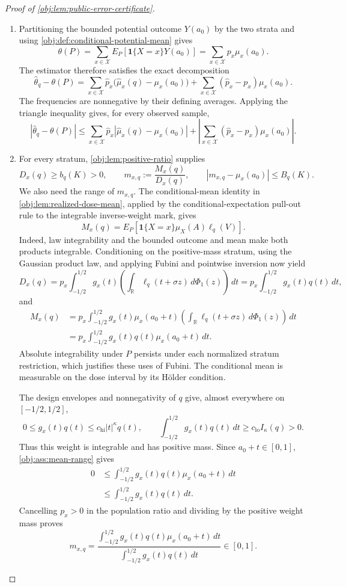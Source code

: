 \documentclass[11pt]{article}
\begin{document}
\begin{proof}[Proof of \cref{obj:lem:public-error-certificate}]
\begin{enumerate}
\item
Partitioning the bounded potential outcome \(Y(a_0)\) by the two strata
and using \cref{obj:def:conditional-potential-mean} gives
\[
\theta(P)
=\sum_{x\in\mathcal X}E_P[\mathbf1\{X=x\}Y(a_0)]
=\sum_{x\in\mathcal X}p_x\mu_x(a_0).
\]
The estimator therefore satisfies the exact decomposition
\[
\widehat\theta_q-\theta(P)
=\sum_{x\in\mathcal X}\widehat p_x
       \bigl(\widehat\mu_x(q)-\mu_x(a_0)\bigr)
 +\sum_{x\in\mathcal X}(\widehat p_x-p_x)\mu_x(a_0).
\]
The frequencies are nonnegative by their defining averages. Applying the
triangle inequality gives, for every observed sample,
\[
|\widehat\theta_q-\theta(P)|
\le
\sum_{x\in\mathcal X}\widehat p_x
       |\widehat\mu_x(q)-\mu_x(a_0)|
+\left|\sum_{x\in\mathcal X}(\widehat p_x-p_x)\mu_x(a_0)\right|.
\]

\item
For every stratum, \cref{obj:lem:positive-ratio} supplies
\[
D_x(q)\ge b_q(K)>0,\qquad
m_{x,q}:=\frac{M_x(q)}{D_x(q)},\qquad
|m_{x,q}-\mu_x(a_0)|\le B_q(K).
\]
We also need the range of \(m_{x,q}\). The conditional-mean identity in
\cref{obj:lem:realized-dose-mean}, applied by the conditional-expectation
pull-out rule to the integrable inverse-weight mark, gives
\[
M_x(q)
=E_P[\mathbf1\{X=x\}\mu_X(A)\ell_q(V)].
\]
Indeed, law integrability and the bounded outcome and mean make both
products integrable. Conditioning on the positive-mass stratum, using
the Gaussian product law, and applying Fubini and pointwise inversion
now yield
\[
D_x(q)
=p_x\int_{-1/2}^{1/2}g_x(t)
       \left(\int_{\mathbb R}\ell_q(t+\sigma z)\,d\Phi_1(z)\right)\,dt
=p_x\int_{-1/2}^{1/2}g_x(t)q(t)\,dt,
\]
and
\[
\begin{aligned}
M_x(q)
&=p_x\int_{-1/2}^{1/2}g_x(t)\mu_x(a_0+t)
       \left(\int_{\mathbb R}\ell_q(t+\sigma z)\,d\Phi_1(z)\right)\,dt\\
&=p_x\int_{-1/2}^{1/2}g_x(t)q(t)\mu_x(a_0+t)\,dt.
\end{aligned}
\]
Absolute integrability under \(P\) persists under each normalized
stratum restriction, which justifies these uses of Fubini. The
conditional mean is measurable on the dose interval by its Hölder
condition.

The design envelopes and nonnegativity of \(q\) give, almost everywhere
on \([-1/2,1/2]\),
\[
0\le g_x(t)q(t)\le c_{\mathrm{hi}}|t|^\kappa q(t),
\qquad
\int_{-1/2}^{1/2}g_x(t)q(t)\,dt
\ge c_{\mathrm{lo}}I_\kappa(q)>0.
\]
Thus this weight is integrable and has positive mass. Since
\(a_0+t\in[0,1]\), \cref{obj:ass:mean-range} gives
\[
\begin{aligned}
0
&\le\int_{-1/2}^{1/2}g_x(t)q(t)\mu_x(a_0+t)\,dt\\
&\le\int_{-1/2}^{1/2}g_x(t)q(t)\,dt.
\end{aligned}
\]
Cancelling \(p_x>0\) in the population ratio and dividing by the positive
weight mass proves
\[
m_{x,q}
=\frac{\displaystyle\int_{-1/2}^{1/2}g_x(t)q(t)\mu_x(a_0+t)\,dt}
       {\displaystyle\int_{-1/2}^{1/2}g_x(t)q(t)\,dt}
\in[0,1].
\]


\end{enumerate}
\end{proof}
\end{document}
